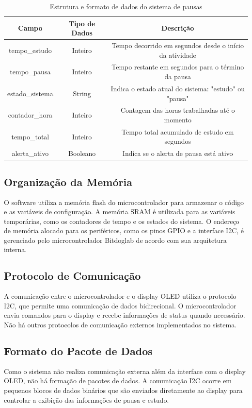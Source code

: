\documentclass{article}
\begin{document}
\begin{table}[h!]
    \centering
    \begin{tabular}{|c|c|c|}
        \hline
        \textbf{Campo} & \textbf{Tipo de Dados} & \textbf{Descrição} \\ 
        \hline
        tempo\_estudo & Inteiro & Tempo decorrido em segundos desde o início da atividade \\ 
        \hline
        tempo\_pausa & Inteiro & Tempo restante em segundos para o término da pausa \\ 
        \hline
        estado\_sistema & String & Indica o estado atual do sistema: "estudo" ou "pausa" \\ 
        \hline
        contador\_hora & Inteiro & Contagem das horas trabalhadas até o momento \\ 
        \hline
        tempo\_total & Inteiro & Tempo total acumulado de estudo em segundos \\ 
        \hline
        alerta\_ativo & Booleano & Indica se o alerta de pausa está ativo \\ 
        \hline
    \end{tabular}
    \caption{Estrutura e formato de dados do sistema de pausas}
    \label{tab:estrutura_dados}
\end{table}

\subsection{Organização da Memória}
O software utiliza a memória flash do microcontrolador para armazenar o código e as variáveis de configuração. A memória SRAM é utilizada para as variáveis temporárias, como os contadores de tempo e os estados do sistema. O endereço de memória alocado para os periféricos, como os pinos GPIO e a interface I2C, é gerenciado pelo microcontrolador Bitdoglab de acordo com sua arquitetura interna.

\subsection{Protocolo de Comunicação}
A comunicação entre o microcontrolador e o display OLED utiliza o protocolo I2C, que permite uma comunicação de dados bidirecional. O microcontrolador envia comandos para o display e recebe informações de status quando necessário. Não há outros protocolos de comunicação externos implementados no sistema.

\subsection{Formato do Pacote de Dados}
Como o sistema não realiza comunicação externa além da interface com o display OLED, não há formação de pacotes de dados. A comunicação I2C ocorre em pequenos blocos de dados binários que são enviados diretamente ao display para controlar a exibição das informações de pausa e estudo.
\end{document}
